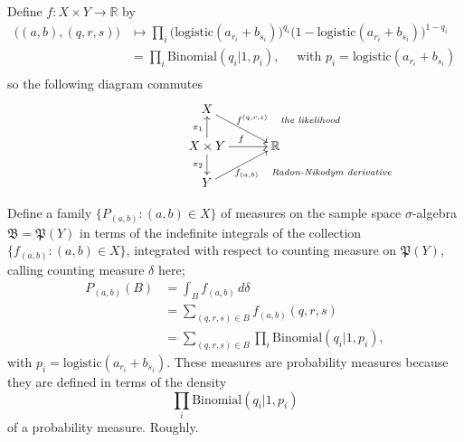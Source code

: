 \documentclass[
twoside=true,
paper=letter,
fontsize=9pt,
pagesize=auto,
leqno,
openany,
headsepline,
overfullrule,
]{scrbook}
\theoremstyle{plain}
\theoremstyle{plain}
\theoremstyle{definition}
\theoremstyle{bfnoteitalic}
\theoremstyle{bfnoteroman}
\newcommand{\sigalg}[1]{\mathfrak{#1}}
\newcommand{\textsigma}{\hbox{\large{$\sigma$}}\kern-1pt}
\newcommand{\R}{\mathbb{R}}
\newcommand{\powerset}{\mathfrak{P}}
\newcommand{\function}{f}
\newcommand{\measurespace}{X}
\newcommand{\measurespaceii}{Y}
\newcommand{\setii}{B}
\newcommand{\projectionone}{\pi_1}
\newcommand{\projectiontwo}{\pi_2}
\newcommand{\pspace}{\measurespace}%
\newcommand{\sspace}{\measurespaceii}%
\newcommand{\sspacesig}{\sigalg{B}}
\begin{document}
Define $\function:\pspace\times\sspace \to \R$ by 
\begin{align*}
\bigl((a,b),(q,r,s)\bigr)
& \mapsto
\prod_i
\bigl( \text{logistic}(a_{r_i} + b_{s_i}) \bigr)^{q_i}
\bigl( 1 - \text{logistic}(a_{r_i} + b_{s_i}) \bigr)^{1-q_i} \\
& = \prod_i
\text{Binomial}(q_i \vert 1, p_i),\quad \text{ with $p_i = \text{logistic}(a_{r_i} + b_{s_i})$} \\
\end{align*}
so the following diagram commutes
\[
\xymatrix@R=16pt@C=30pt{ 
\pspace \ar[dr]^{\ \function^{(q,r,s)}\quad \rlap{\emph{\scriptsize the likelihood}}}
& \\
\pspace\times\sspace 
\ar[u]^{\projectionone}
\ar[d]_{\projectiontwo}
\ar[r]^{\function}
& \R \\
\sspace 
\ar[ur]_{\function_{(a,b)} \quad \rlap{\emph{\scriptsize Radon-Nikodym derivative}}} 
& 
}
\]

Define a family $\{P_{(a,b)}:(a,b)\in\pspace\}$ of measures on the sample space \textsigma-algebra
$\sspacesig=\powerset(\sspace)$ in terms of the indefinite integrals of the collection
$\{ \function_{(a,b)} : (a,b)\in\pspace \}$, integrated with respect to counting measure on 
$\powerset(\sspace)$, calling counting measure $\delta$ here;
\begin{align*}
P_{(a,b)}(\setii)
& = \int_\setii \function_{(a,b)} \,d\delta \\
& = \sum_{(q,r,s)\in\setii} \function_{(a,b)}(q,r,s) \\
& = \sum_{(q,r,s)\in\setii} \prod_i \text{Binomial}(q_i\vert 1,p_i),
\end{align*}
with $p_i=\text{logistic}(a_{r_i} + b_{s_i})$.
These measures are probability measures because they are defined in terms of the density 
\[
\prod_i \text{Binomial}(q_i\vert 1,p_i)
\]
of a probability measure. Roughly.
\end{document}

